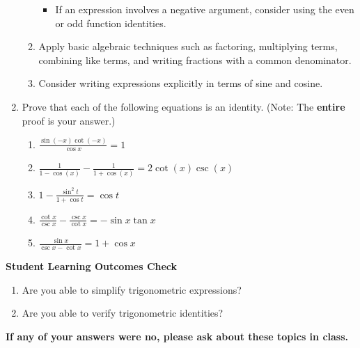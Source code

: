 \documentclass[11pt]{article}
\newcommand{\boxcolor}{gray!30}
\newenvironment{boxthm}{\begin{mdframed}[backgroundcolor=\boxcolor,nobreak=true]}{\end{mdframed}}
\begin{document}
\begin{enumerate}
\begin{boxthm}
\begin{enumerate}
\begin{itemize}
\item If an expression involves a negative argument, consider using the even or odd function identities.

\end{itemize}

\item Apply basic algebraic techniques such as factoring, multiplying terms, combining like terms, and writing fractions with a common denominator.

\item Consider writing expressions explicitly in terms of sine and cosine.

\end{enumerate}

\end{boxthm}

\newpage

\item Prove that each of the following equations is an identity. (Note: The {\bf entire} proof is your answer.)
\begin{enumerate}
\item $\displaystyle \frac{\sin(-x)\cot(-x)}{\cos x} = 1$
\vfill

\item $\displaystyle \frac{1}{1-\cos (x)}-\frac{1}{1+\cos (x)} = 2\cot (x)\csc (x)$
\vfill
\vfill
\newpage

\item $\displaystyle 1 - \frac{\sin^2 t}{1+\cos t} = \cos t$
\vfill

\item $\displaystyle \frac{\cot x}{\csc x}-\frac{\csc x}{\cot x} = -\sin x \tan x$
\vfill

\newpage


\item $\displaystyle \frac{\sin x}{\csc x - \cot x} = 1+\cos x$
\vfill


\end{enumerate}


\end{enumerate}
\vfill
\noindent \textbf{Student Learning Outcomes Check}

\begin{enumerate}
\item Are you able to simplify trigonometric expressions?
\item Are you able to verify trigonometric identities?

\end{enumerate}

\noindent \textbf{If any of your answers were no, please ask about these topics in class.}
\end{document}
